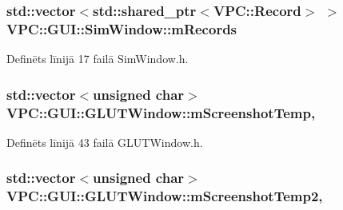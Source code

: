 \subsubsection[{\texorpdfstring{m\+Records}{mRecords}}]{\setlength{\rightskip}{0pt plus 5cm}std\+::vector$<$std\+::shared\+\_\+ptr$<${\bf V\+P\+C\+::\+Record}$>$ $>$ V\+P\+C\+::\+G\+U\+I\+::\+Sim\+Window\+::m\+Records}\hypertarget{class_v_p_c_1_1_g_u_i_1_1_sim_window_ac03e0d1150d2500065462383074d38df}{}\label{class_v_p_c_1_1_g_u_i_1_1_sim_window_ac03e0d1150d2500065462383074d38df}


Definēts līnijā 17 failā Sim\+Window.\+h.

\subsubsection[{\texorpdfstring{m\+Screenshot\+Temp}{mScreenshotTemp}}]{\setlength{\rightskip}{0pt plus 5cm}std\+::vector$<$unsigned char$>$ V\+P\+C\+::\+G\+U\+I\+::\+G\+L\+U\+T\+Window\+::m\+Screenshot\+Temp\hspace{0.3cm}{\ttfamily [protected]}, {\ttfamily [inherited]}}\hypertarget{class_v_p_c_1_1_g_u_i_1_1_g_l_u_t_window_a3fb2ef7f66b526626c242cf35a4af080}{}\label{class_v_p_c_1_1_g_u_i_1_1_g_l_u_t_window_a3fb2ef7f66b526626c242cf35a4af080}


Definēts līnijā 43 failā G\+L\+U\+T\+Window.\+h.

\subsubsection[{\texorpdfstring{m\+Screenshot\+Temp2}{mScreenshotTemp2}}]{\setlength{\rightskip}{0pt plus 5cm}std\+::vector$<$unsigned char$>$ V\+P\+C\+::\+G\+U\+I\+::\+G\+L\+U\+T\+Window\+::m\+Screenshot\+Temp2\hspace{0.3cm}{\ttfamily [protected]}, {\ttfamily [inherited]}}\hypertarget{class_v_p_c_1_1_g_u_i_1_1_g_l_u_t_window_a9a373bab4c85c9a39d5b188311509ea6}{}\label{class_v_p_c_1_1_g_u_i_1_1_g_l_u_t_window_a9a373bab4c85c9a39d5b188311509ea6}


